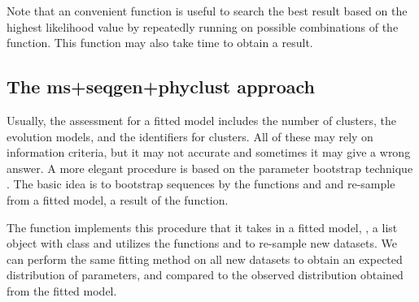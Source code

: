 Note that an convenient function  is useful to
search the best result based on the highest likelihood value by
repeatedly running on possible combinations
of the  function. This function may also take
time to obtain a result.




\subsection[The ms+seqgen+phyclust approach]{The ms+seqgen+phyclust approach}
\label{sec:msseqgenphyclust}

Usually, the assessment for a fitted model includes the number of clusters,
the evolution models, and the identifiers for clusters. All of these may
rely on information criteria, but it may not accurate and sometimes
it may give a wrong answer. A more elegant procedure is based on
the parameter bootstrap technique \citep{Maitra2010}.
The basic idea is
to bootstrap sequences by the functions  and 
and re-sample from a fitted model, a result of the 
function.

The  function implements this procedure
that it takes in a fitted model, , a list object with class
 and utilizes the functions  and 
to re-sample new datasets. We can perform the same fitting method on
all new datasets to obtain an expected distribution of parameters,
and compared to the observed distribution obtained from the fitted model.

